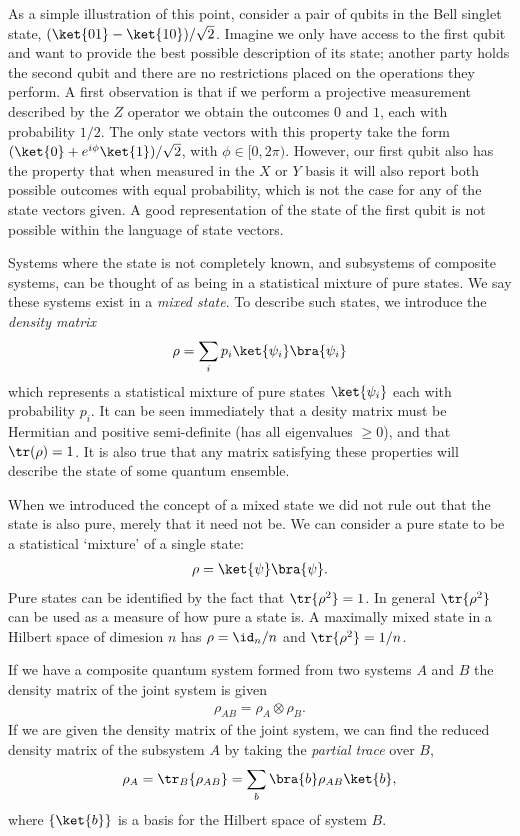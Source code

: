 As a simple illustration of this point, consider a pair of qubits in the Bell singlet state, $(\ket{01} - \ket{10})/\sqrt{2}$. Imagine we only have access to the first qubit and want to provide the best possible description of its state; another party holds the second qubit and there are no restrictions placed on the operations they perform. A first observation is that if we perform a projective measurement described by the $Z$ operator we obtain the outcomes $0$ and $1$, each with probability $1/2$. The only state vectors with this property take the form $(\ket{0} + e^{i\phi}\ket{1})/\sqrt{2}$, with $\phi \in [0, 2\pi)$. However, our first qubit also has the property that when measured in the $X$ or $Y$ basis it will also report both possible outcomes with equal probability, which is not the case for any of the state vectors given. A good representation of the state of the first qubit is not possible within the language of state vectors.

Systems where the state is not completely known, and subsystems of composite systems, can be thought of as being in a statistical mixture of pure states. We say these systems exist in a \textit{mixed state}. To describe such states, we introduce the \textit{density matrix}
\begin{align}
  \rho = \sum_i p_i \ket{\psi_i}\bra{\psi_i} 
\end{align}
which represents a statistical mixture of pure states $\ket{\psi_i}$ each with probability $p_i$. It can be seen immediately that a desity matrix must be Hermitian and positive semi-definite (has all eigenvalues $\geq 0$), and that $\tr(\rho) = 1$. It is also true that any matrix satisfying these properties will describe the state of some quantum ensemble.

When we introduced the concept of a mixed state we did not rule out that the state is also pure, merely that it need not be. We can consider a pure state to be a statistical `mixture' of a single state:
\begin{align}
  \rho = \ket{\psi}\bra{\psi}.
\end{align}
Pure states can be identified by the fact that $\tr\{\rho^2\} = 1$. In general $\tr\{\rho^2\}$ can be used as a measure of how pure a state is. A maximally mixed state in a Hilbert space of dimesion $n$ has $\rho = \id_n/n$ and $\tr\{\rho^2\} = 1/n$.

If we have a composite quantum system formed from two systems $A$ and $B$ the density matrix of the joint system is given
\begin{align}
  \rho_{AB} = \rho_A \otimes \rho_B. 
\end{align}
If we are given the density matrix of the joint system, we can find the reduced density matrix of the subsystem $A$ by taking the \textit{partial trace} over $B$,
\begin{align}
  \rho_A = \tr_B\{\rho_{AB}\} = \sum_b \bra{b}\rho_{AB}\ket{b},
\end{align}
where $\{\ket{b}\}$ is a basis for the Hilbert space of system $B$. 

